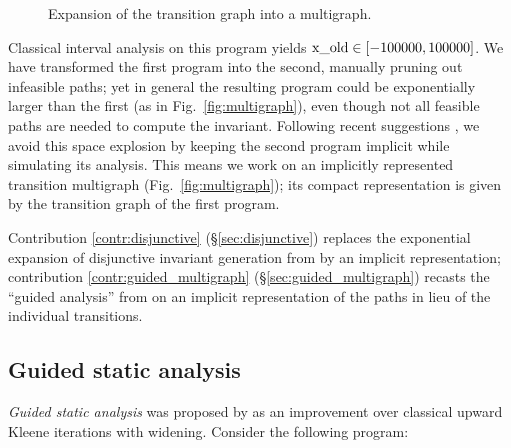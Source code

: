 \documentclass[preprint]{sigplanconf}
\begin{document}
\begin{figure}
\begin{minipage}[c]{.19\textwidth}
\end{minipage}
\caption{Expansion of the transition graph into a multigraph.}
\end{figure}

Classical interval analysis on this program yields $\lstinline|x_old| \in [-100000,100000]$.
We have transformed the first program into the second, manually pruning out infeasible paths; yet in general the resulting program could be exponentially larger than the first (as in Fig.~\ref{fig:multigraph}), even though not all feasible paths are needed to compute the invariant.
Following recent suggestions \cite{Gawlitza_Monniaux_ESOP11,Monniaux_Gonnord_SAS11}, we avoid this space explosion by keeping the second program implicit while simulating its analysis. This means we work on an implicitly represented transition multigraph (Fig.~\ref{fig:multigraph}); its compact representation is given by the transition graph of the first program.

Contribution \ref{contr:disjunctive} (\S\ref{sec:disjunctive}) replaces the exponential expansion of disjunctive invariant generation from \citet{DBLP:conf/pldi/GulwaniZ10} by an implicit representation;
contribution \ref{contr:guided_multigraph} (\S\ref{sec:guided_multigraph}) recasts the ``guided analysis'' from \citet{DBLP:conf/sas/GopanR07} on an implicit representation of the paths in lieu of the individual transitions.

\subsection{Guided static analysis}
\label{sec:guided}
\emph{Guided static analysis} was proposed by \citet{DBLP:conf/sas/GopanR07} as an improvement over classical upward Kleene iterations with widening.
Consider the following program:

\end{document}
